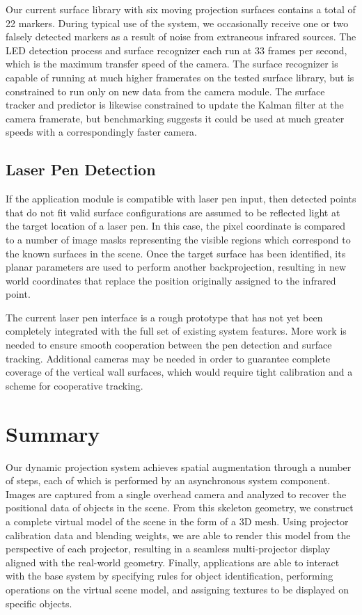 \documentclass{thesis}
\begin{document}
Our current surface library with six moving projection surfaces
contains a total of 22 markers. During typical use of the system, we occasionally receive one or two falsely detected markers as a result of noise from extraneous infrared sources. The LED detection process and surface recognizer each run at 33 frames per second, which is the maximum transfer speed of the camera. The surface recognizer is capable of running at much higher framerates on the tested surface library, but is constrained to run only on new data from the camera module. The surface tracker and predictor is likewise constrained to update the Kalman filter at the camera framerate, but benchmarking suggests it could be used at much greater speeds with a correspondingly faster camera.
 
\subsection{Laser Pen Detection }

If the application module is compatible with laser pen input, then detected points that do not fit valid surface configurations are assumed to be reflected light at the target location of a laser pen. In this case, the pixel coordinate is compared to a number of image masks representing the visible regions which correspond to the known surfaces in the scene. Once the target surface has been identified, its planar parameters are used to perform another backprojection, resulting in new world coordinates that replace the position originally assigned to the infrared point.

The current laser pen interface is a rough prototype that has not yet been completely integrated with the full set of existing system features. More work is needed to ensure smooth cooperation between the pen detection and surface tracking. Additional cameras may be needed in order to guarantee complete coverage of the vertical wall surfaces, which would require tight calibration and a scheme for cooperative tracking.

\section{Summary }

Our dynamic projection system achieves spatial augmentation through a number of steps, each of which is performed by an asynchronous system component. Images are captured from a single overhead camera and analyzed to recover the positional data of objects in the scene. From this skeleton geometry, we construct a complete virtual model of the scene in the form of a 3D mesh. Using projector calibration data and blending weights, we are able to render this model from the perspective of each projector, resulting in a seamless multi-projector display aligned with the real-world geometry. Finally, applications are able to interact with the base system by specifying rules for object identification, performing operations on the virtual scene model, and assigning textures to be displayed on specific objects.
\end{document}

